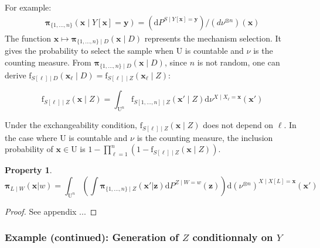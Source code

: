 \documentclass[12pt]{article}
\newtheorem{property}{Property}[section]
\theoremstyle{definition}
\theoremstyle{remark}
\newcommand{\dominantU}{\nu}
\newcommand{\sampledensity}{\mathbf{\pi}}
\newcommand{\derive}{\mathrm{d}}
\newcommand{\Design}{D}
\newcommand{\density}{\mathrm{f}}
\newcommand{\Sample}{S}
\newcommand{\Pop}{\mathrm{U}}
\newcommand{\position}{\mathbf{x}}
\newcommand{\Sampleindex}{L}
\newcommand{\Signal}{Y}
\newcommand{\signal}{\mathbf{y}}
\newcommand{\Desvar}{Z}
\newcommand{\desvar}{\mathbf{z}}
\begin{document}
For example:
\begin{eqnarray}\label{eq:iurheiuhgiuh}
\sampledensity_{\{1,\ldots,n\}}\left(\position \mid \Signal[\position]=
    \signal\right)=
(\mathrm{d}P^{\Sample\mid \Signal[\position]= \signal})/(d\dominantU^{\otimes n})(\position)
\end{eqnarray}
The function $\position\mapsto\sampledensity_{\{1,\ldots,n\}\mid\Design}\left(\position \mid \Design\right)$ represents the mechanism selection. It gives the probability to select the sample when $\Pop$ is countable and $\dominantU$ is the counting measure.
From $\sampledensity_{\{1,\ldots,n\}\mid\Design}\left(\position \mid \Design\right)$, since $n$ is not random, one can derive  $\density_{\Sample[\ell]\mid \Design}(\position_\ell\mid \Design)=
\density_{\Sample[\ell]\mid \Desvar}(\position_\ell\mid \Desvar)$:

$$\density_{\Sample[\ell]\mid \Desvar}(\position\mid \Desvar)=
\int_{\Pop^n}
{\density_{\Sample[1,\ldots,n]\mid \Desvar}(\position'\mid \Desvar)}
\derive \dominantU^{X\mid X_\ell=\position}(\position')$$

Under the exchangeability condition, 
$\density_{\Sample[\ell]\mid \Desvar}(\position\mid \Desvar)$ does not depend on $\ell$. In the case where $\Pop$ is countable and $\dominantU$ is the counting measure, the inclusion probability of $\position\in\Pop$ is $1-\prod_{\ell=1}^n(1-\density_{\Sample[\ell]\mid \Desvar}(\position\mid \Desvar))$.


\begin{property}\label{prop:oijsoidfj}
\begin{equation}
    \sampledensity_{\Sampleindex\mid W}\left(\position|w\right)=
    \int_{\Pop^n}\left(
    \int \sampledensity_{\{1,\ldots,n\}\mid \Desvar}\left(\position'|\desvar\right) \derive P^{\Desvar\mid W=w}(\desvar)\right)
    \derive\left(\nu^{\otimes n}\right)^{X\mid X[\Sampleindex]=\position}(\position')
\end{equation}
\end{property}
\begin{proof}
See appendix ...
\end{proof}



\subsubsection*{Example (continued): Generation of $\Desvar$ conditionnaly on $\Signal$}
\end{document}
